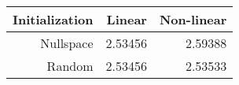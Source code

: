 \begin{tabular}{rrr}
  \hline
  \textbf{Initialization} & \textbf{Linear} & \textbf{Non-linear} \\\hline
  Nullspace & 2.53456 & 2.59388 \\
  Random & 2.53456 & 2.53533 \\\hline
\end{tabular}
